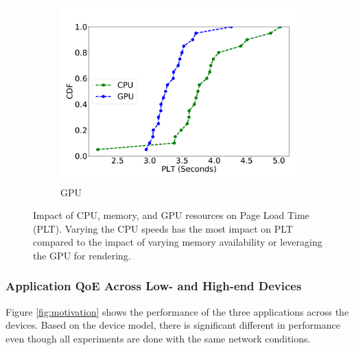 \begin{figure}
\begin{subfigure}[b]{0.33\textwidth}
        \includegraphics[width=1\linewidth]{sections/device-work/plt-gpu}
        \caption{GPU}
    \end{subfigure}
     \caption{Impact of CPU, memory, and GPU resources on Page Load Time (PLT). Varying the CPU speeds has the most impact on PLT compared to the impact of varying memory availability or leveraging the GPU for rendering. }
     \vspace{-0.2in}
     \label{fig:isolation}
\end{figure}



\subsubsection{Application QoE Across Low- and High-end Devices}

Figure \ref{fig:motivation} shows the performance of the three applications across the devices. Based on the device model, there is significant different in performance even though all experiments
are done with the same network conditions. 

